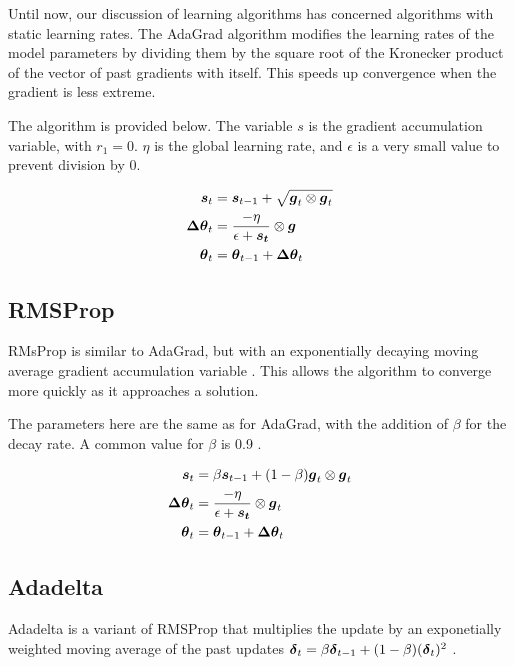 \documentclass{article}
\begin{document}
Until now, our discussion of learning algorithms has concerned algorithms with static learning rates. The AdaGrad algorithm modifies the learning rates of the model parameters by dividing them by the square root of the Kronecker product of the vector of past gradients with itself. This speeds up convergence when the gradient is less extreme. 

The algorithm is provided below. The variable \(s\) is the gradient accumulation variable, with \(r_1 = 0\). \(\eta\) is the global learning rate, and \(\epsilon\) is a very small value to prevent division by \(0\).

\begin{align*}
    \vb*{s}_t &= \vb*{s}_{t-1} + \sqrt{\vb*{g}_t \otimes \vb*{g}_t} \\
    \vb*{\Delta \theta}_t &= \frac{-\eta}{\epsilon + \vb*{s_t}} \otimes \vb*{g} \\
    \vb*{\theta}_t &= \vb*{\theta}_{t-1} + \vb*{\Delta \theta}_t
\end{align*}

\subsection{RMSProp} %

RMsProp is similar to AdaGrad, but with an exponentially decaying moving average gradient accumulation variable \cite{Goodfellow-et-al-2016}. This allows the algorithm to converge more quickly as it approaches a solution.

The parameters here are the same as for AdaGrad, with the addition of \(\beta\) for the decay rate. A common value for \(\beta\) is 0.9 \cite{pml1book}.

\begin{align*}
    \vb*{s}_t &= \beta \vb*{s}_{t-1} + (1-\beta)\vb*{g}_t \otimes \vb*{g}_t \\
    \vb*{\Delta \theta}_t &= \frac{-\eta}{\epsilon + \vb*{s_t}} \otimes \vb*{g}_t \\
    \vb*{\theta}_t &= \vb*{\theta}_{t-1} + \vb*{\Delta \theta}_t
\end{align*}

\subsection{Adadelta} %

Adadelta is a variant of RMSProp that multiplies the update by an exponetially weighted moving average of the past updates \(\vb*{\delta}_t = \beta \vb*{\delta}_{t-1} + (1-\beta)(\vb*{\delta}_t)^2\) \cite{pml1book} \cite{zeiler2012}.
\end{document}
